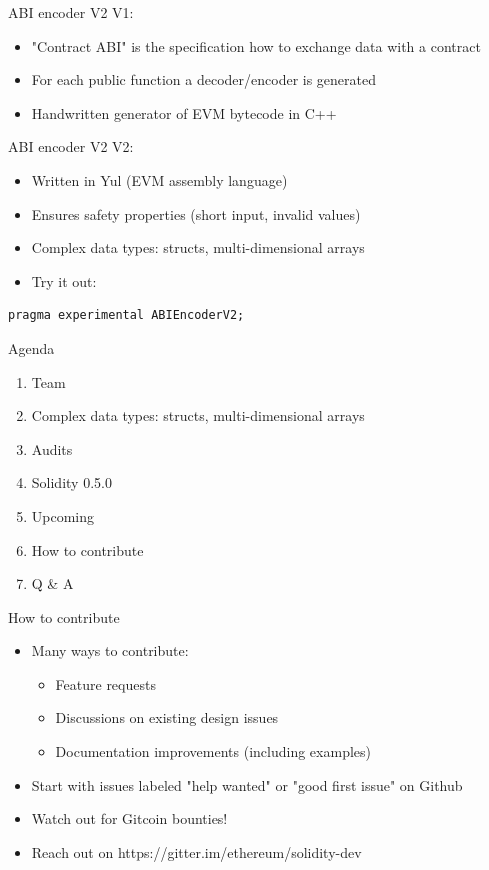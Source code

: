 \documentclass[aspectratio=169,10pt]{beamer}
\begin{document}
\begin{frame}{ABI encoder V2}
  V1:
  \begin{itemize}
    \item "Contract ABI" is the specification how to exchange data with a contract
    \item For each public function a decoder/encoder is generated
    \item Handwritten generator of EVM bytecode in C++  
  \end{itemize}
\end{frame}


\begin{frame}[fragile]{ABI encoder V2}
  V2:
  \begin{itemize}
    \item Written in Yul (EVM assembly language)
    \item Ensures safety properties (short input, invalid values)
    \item Complex data types: structs, multi-dimensional arrays
    \item Try it out:
  \end{itemize}
  \begin{mdframed}
    \begin{lstlisting}[language=Solidity]
pragma experimental ABIEncoderV2;
    \end{lstlisting}
  \end{mdframed}
\end{frame}

\begin{frame}{Agenda}
	\begin{enumerate}
  \item Team\item Complex data types: structs, multi-dimensional arrays
  \item Audits
	\item Solidity 0.5.0
	\item Upcoming
	\item \alert{How to contribute}
	\item Q \& A
	\end{enumerate}
\end{frame}

\begin{frame}{How to contribute}
  \begin{itemize}
    \item Many ways to contribute:
    \begin{itemize}
      \item Feature requests
      \item Discussions on existing design issues
      \item Documentation improvements (including examples)
    \end{itemize}
    \item Start with issues labeled \alert{"help wanted"} or \alert{"good first issue"} on Github
    \item Watch out for Gitcoin bounties!
    \item Reach out on https://gitter.im/ethereum/solidity-dev
	\end{itemize}
\end{frame}
\end{document}
